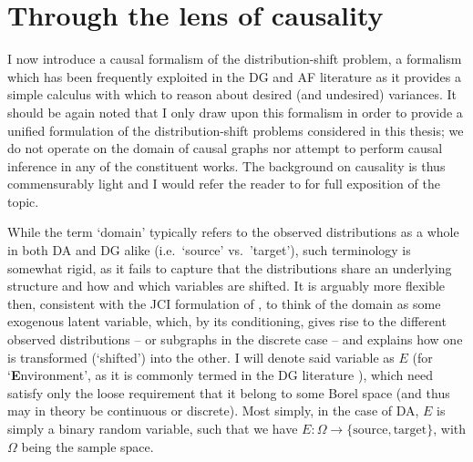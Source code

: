 \section{Through the lens of causality}\label{sec:lens-of-causality}
I now introduce a causal formalism of the distribution-shift problem, a formalism which has been
frequently exploited in the \ac{DG} and \ac{AF} literature as it provides a simple calculus with
which to reason about desired (and undesired) variances.
%
It should be again noted that I only draw upon this formalism in order to provide a unified
formulation of the distribution-shift problems considered in this thesis; we do not operate on the
domain of causal graphs nor attempt to perform causal inference in any of the constituent works. 
%
The background on causality is thus commensurably light and I would refer the reader to
\citet{pearl2009causality} for full exposition of the topic.

While the term `domain' typically refers to the observed distributions as a whole in both \ac{DA}
and \ac{DG} alike (i.e.\ `source' vs.\ 'target'), such terminology is somewhat rigid, as it fails
to capture that the distributions share an underlying structure and how and which variables are
shifted.
%
%
It is arguably more flexible then, consistent with the JCI formulation of \citet{mooij2020joint}, to
think of the domain as some exogenous latent variable, which, by its conditioning, gives rise to
the different observed distributions -- or subgraphs in the discrete case -- and explains how one
is transformed (`shifted') into the other.
%
I will denote said variable as \(E\) (for `\textbf{E}nvironment', as it is commonly termed in the
\ac{DG} literature \citep{arjovsky2019invariant}), which need satisfy only the loose requirement that it
belong to some Borel space (and thus may in theory be continuous or discrete).
%
Most simply, in the case of \ac{DA}, \(E\) is simply a binary random variable, such that we have \(E:
\Omega \to \{ \text{source}, \text{target} \}\), with \( \Omega \) being the sample space.
%

